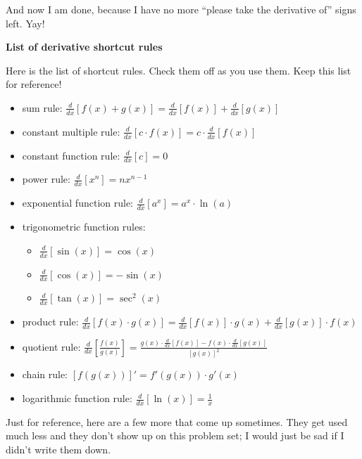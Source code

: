 \documentclass[letter, 12pt]{article}
\renewcommand{\section}[1]{\begin{center} \textbf{#1} \\\end{center}}
\newcommand{\diff}[1]{\frac{d}{d#1}}
\begin{document}
And now I am done, because I have no more ``please take the derivative of'' signs left. Yay!

\pagebreak

\section{List of derivative shortcut rules}

Here is the list of shortcut rules. Check them off as you use them. Keep this list for reference!
{ \everymath{\displaystyle}
    \begin{itemize}[label=\(\square\)]
        \item sum rule: $\diff{x}[f(x)+g(x)] = \diff{x}[f(x)]+\diff{x}[g(x)]$ 
        \item constant multiple rule: $\diff{x}[c\cdot f(x)] = c\cdot\diff{x}[f(x)]$
        \item constant function rule: $\diff{x}[c] = 0$
        \item power rule: $\diff{x}[x^n] = nx^{n-1}$
        \item exponential function rule: $\diff{x}[a^x] = a^x\cdot\ln(a)$
        \item trigonometric function rules: 
        \begin{itemize}[label=\(\bigcirc\)]
            \item $\diff{x}[\sin(x)] = \cos(x)$
            \item $\diff{x}[\cos(x)] = -\sin(x)$
            \item $\diff{x}[\tan(x)] = \sec^2(x)$
        \end{itemize}
        \item product rule: $\diff{x}[f(x) \cdot g(x)] = \diff{x}[f(x)] \cdot g(x) + \diff{x}[g(x)] \cdot f(x)$
        \item quotient rule: $\diff{x}\left[\frac{f(x)}{g(x)}\right] 
        = \frac{g(x) \cdot \diff{x}[f(x)] - f(x) \cdot \diff{x}[g(x)]}{[g(x)]^2}$
        \item chain rule: $[f(g(x))]' = f'(g(x)) \cdot g'(x)$
        \item logarithmic function rule: $\diff{x}[\ln(x)] = \frac{1}{x}$
    \end{itemize}
    \hrulefill

    Just for reference, here are a few more that come up sometimes. They get used much less and they don't show up on this problem set; I would just be sad if I didn't write them down.
    \begin{multicols}{2}
        

\end{multicols}}
\end{document}
